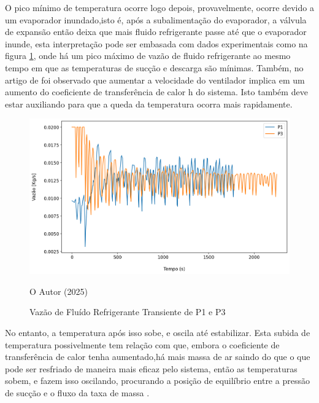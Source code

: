 O pico mínimo de temperatura ocorre logo depois, provavelmente, ocorre devido a um evaporador inundado,isto é, após a subalimentação do evaporador, a válvula de expansão então deixa que mais fluido refrigerante passe até que o evaporador inunde, esta interpretação pode ser embasada com dados experimentais como na figura \ref{fig:VazãodeFluidoPerturbaçãoVentilador}, onde há um pico máximo de vazão de fluido refrigerante ao mesmo tempo em que as temperaturas de sucção e descarga são mínimas. Também, no artigo de \textcite{VaryingFanSpeedCavallaro} foi observado que aumentar a velocidade do ventilador implica em um aumento do coeficiente de transferência de calor h do sistema. Isto também deve estar auxiliando para que a queda da temperatura ocorra mais rapidamente.
\newpage
\begin{figure}[h]
    \centering
    \includegraphics[width=1\linewidth]{FigurasdoTexto/VazãodeFluidoPerturbaçãoVentilador.png}
    \caption{Vazão de Fluído Refrigerante Transiente de P1 e P3}
    \label{fig:VazãodeFluidoPerturbaçãoVentilador}
    {\footnotesize O Autor (2025)}
\end{figure}

No entanto, a temperatura após isso sobe, e oscila até estabilizar. Esta subida de temperatura possivelmente tem relação com que, embora o coeficiente de transferência de calor tenha aumentado,há mais massa de ar saindo do que o que pode ser resfriado de maneira mais eficaz pelo sistema, então as temperaturas sobem, e fazem isso oscilando, procurando a posição de equilíbrio entre a pressão de sucção e o fluxo da taxa de massa \cite{StoekerRefrigeration}.  

